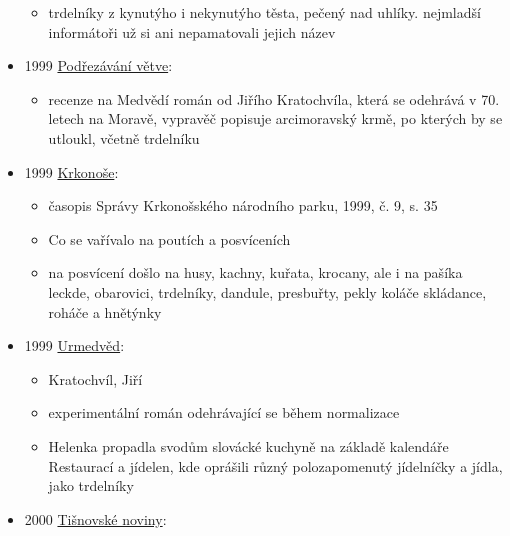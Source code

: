 \begin{itemize}
  \begin{itemize}
  \tightlist
  \item
    trdelníky z kynutýho i nekynutýho těsta, pečený nad uhlíky.
    nejmladší informátoři už si ani nepamatovali jejich název
  \end{itemize}
\item
  1999
  \href{https://ceskadigitalniknihovna.cz/view/uuid:42ab79d0-0672-11e4-83c7-005056827e51?page=uuid\%3A60685a60-33e0-11e4-8413-5ef3fc9ae867&fulltext=trdel*&source=nkp}{Podřezávání
  větve}:

  \begin{itemize}
  \tightlist
  \item
    recenze na Medvědí román od Jiřího Kratochvíla, která se odehrává v
    70. letech na Moravě, vypravěč popisuje arcimoravský krmě, po
    kterých by se utloukl, včetně trdelníku
  \end{itemize}
\item
  1999
  \href{https://ceskadigitalniknihovna.cz/uuid/uuid:688f803c-f890-4e66-986a-47d85c06d611}{Krkonoše}:

  \begin{itemize}
  \tightlist
  \item
    časopis Správy Krkonošského národního parku, 1999, č. 9, s. 35
  \item
    Co se vařívalo na poutích a posvíceních
  \item
    na posvícení došlo na husy, kachny, kuřata, krocany, ale i na pašíka
    leckde, obarovici, trdelníky, dandule, presbuřty, pekly koláče
    skládance, roháče a hnětýnky
  \end{itemize}
\item
  1999
  \href{https://ceskadigitalniknihovna.cz/uuid/uuid:b931b0f0-a760-11e7-ae0a-005056827e52}{Urmedvěd}:

  \begin{itemize}
  \tightlist
  \item
    Kratochvíl, Jiří
  \item
    experimentální román odehrávající se během normalizace
  \item
    Helenka propadla svodům slovácké kuchyně na základě kalendáře
    Restaurací a jídelen, kde oprášili různý polozapomenutý jídelníčky a
    jídla, jako trdelníky
  \end{itemize}
\item
  2000
  \href{https://ceskadigitalniknihovna.cz/view/uuid:a52ce0c6-2ad8-45b6-a768-ec516dd103f3?page=uuid\%3Af2321a13-5740-11e3-852c-0050569d679d&fulltext=trdeln\%C3\%ADk\%20OR\%20trdeln\%C3\%ADky\%20OR\%20trdeln\%C3\%ADk\%C5\%AF&source=mzk}{Tišnovské
  noviny}:


\end{itemize}
